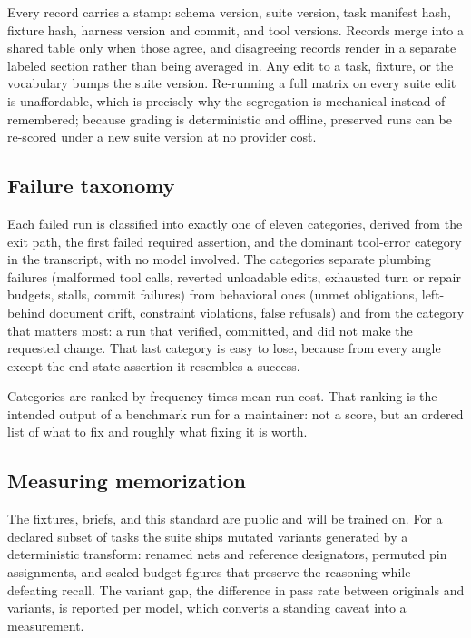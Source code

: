 Every record carries a stamp: schema version, suite version, task manifest hash, fixture hash, harness version and commit, and tool versions. Records merge into a shared table only when those agree, and disagreeing records render in a separate labeled section rather than being averaged in. Any edit to a task, fixture, or the vocabulary bumps the suite version. Re-running a full matrix on every suite edit is unaffordable, which is precisely why the segregation is mechanical instead of remembered; because grading is deterministic and offline, preserved runs can be re-scored under a new suite version at no provider cost.

\subsection{Failure taxonomy}

Each failed run is classified into exactly one of eleven categories, derived from the exit path, the first failed required assertion, and the dominant tool-error category in the transcript, with no model involved. The categories separate plumbing failures (malformed tool calls, reverted unloadable edits, exhausted turn or repair budgets, stalls, commit failures) from behavioral ones (unmet obligations, left-behind document drift, constraint violations, false refusals) and from the category that matters most: a run that verified, committed, and did not make the requested change. That last category is easy to lose, because from every angle except the end-state assertion it resembles a success.

Categories are ranked by frequency times mean run cost. That ranking is the intended output of a benchmark run for a maintainer: not a score, but an ordered list of what to fix and roughly what fixing it is worth.

\subsection{Measuring memorization}

The fixtures, briefs, and this standard are public and will be trained on. For a declared subset of tasks the suite ships mutated variants generated by a deterministic transform: renamed nets and reference designators, permuted pin assignments, and scaled budget figures that preserve the reasoning while defeating recall. The variant gap, the difference in pass rate between originals and variants, is reported per model, which converts a standing caveat into a measurement.
